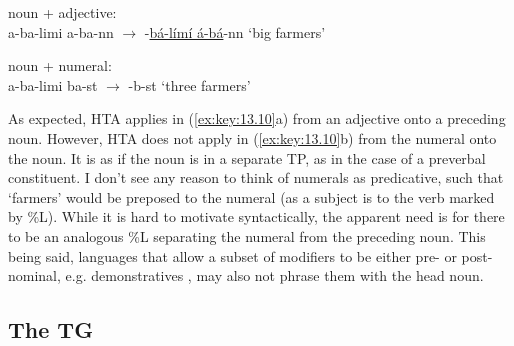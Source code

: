 \documentclass[output=paper]{langsci/langscibook}
\begin{document}
\ea\label{ex:key:13.10}
    \ea noun + adjective:\\
        a-ba-limi  a-ba-nn  ${\rightarrow}$
            -\underline{bá-límí  á-bá}-nn  ‘big farmers’
        \vspace{.75\baselineskip}
    \ex noun + numeral:\\
        a-ba-limi ba-st  ${\rightarrow}$  -b-st  ‘three farmers’
        \vspace{.75\baselineskip}
    \z
\z
As expected, \gls{HTA} applies in (\ref{ex:key:13.10}a) from an adjective onto a
preceding noun. However, \gls{HTA} does not apply in (\ref{ex:key:13.10}b) from
the numeral onto the noun. It is as if the noun is in a separate TP, as in the
case of a preverbal constituent. I don’t see any reason to think of numerals
as predicative, such that ‘farmers’ would be preposed to the numeral (as a
subject is to the verb marked by \%L). While it is hard to motivate
syntactically, the apparent need is for there to be an analogous \%L separating
the numeral from the preceding noun. This being said,  languages that
allow a subset of modifiers to be either pre- or post-nominal, e.g.
demonstratives \parencite{vandeVelde2005}, may also not phrase them with the head noun.

\subsection{The TG}\label{sub:13.2.2}
\end{document}
